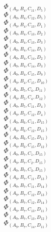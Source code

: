 \documentclass[14pt]{article}
\begin{document}
    $\Phi_{({A}_{9}, {B}_{4}, {C}_{11}, {D}_{5})}$ \\ 
    $\Phi_{({A}_{9}, {B}_{4}, {C}_{12}, {D}_{5})}$ \\ 
    $\Phi_{({A}_{9}, {B}_{4}, {C}_{13}, {D}_{1})}$ \\ 
    $\Phi_{({A}_{9}, {B}_{4}, {C}_{13}, {D}_{2})}$ \\ 
    $\Phi_{({A}_{9}, {B}_{4}, {C}_{13}, {D}_{3})}$ \\ 
    $\Phi_{({A}_{9}, {B}_{4}, {C}_{14}, {D}_{1})}$ \\ 
    $\Phi_{({A}_{9}, {B}_{4}, {C}_{14}, {D}_{2})}$ \\ 
    $\Phi_{({A}_{9}, {B}_{4}, {C}_{14}, {D}_{3})}$ \\ 
    $\Phi_{({A}_{9}, {B}_{4}, {C}_{15}, {D}_{9})}$ \\ 
    $\Phi_{({A}_{9}, {B}_{4}, {C}_{15}, {D}_{10})}$ \\ 
    $\Phi_{({A}_{9}, {B}_{5}, {C}_{4}, {D}_{11})}$ \\ 
    $\Phi_{({A}_{9}, {B}_{5}, {C}_{4}, {D}_{12})}$ \\ 
    $\Phi_{({A}_{9}, {B}_{5}, {C}_{11}, {D}_{4})}$ \\ 
    $\Phi_{({A}_{9}, {B}_{5}, {C}_{12}, {D}_{4})}$ \\ 
    $\Phi_{({A}_{9}, {B}_{6}, {C}_{11}, {D}_{15})}$ \\ 
    $\Phi_{({A}_{9}, {B}_{6}, {C}_{12}, {D}_{15})}$ \\ 
    $\Phi_{({A}_{9}, {B}_{6}, {C}_{15}, {D}_{11})}$ \\ 
    $\Phi_{({A}_{9}, {B}_{6}, {C}_{15}, {D}_{12})}$ \\ 
    $\Phi_{({A}_{9}, {B}_{7}, {C}_{1}, {D}_{15})}$ \\ 
    $\Phi_{({A}_{9}, {B}_{7}, {C}_{2}, {D}_{15})}$ \\ 
    $\Phi_{({A}_{9}, {B}_{7}, {C}_{3}, {D}_{15})}$ \\ 
    $\Phi_{({A}_{9}, {B}_{7}, {C}_{11}, {D}_{13})}$ \\ 
    $\Phi_{({A}_{9}, {B}_{7}, {C}_{11}, {D}_{14})}$ \\ 
    $\Phi_{({A}_{9}, {B}_{7}, {C}_{12}, {D}_{13})}$ \\ 
    $\Phi_{({A}_{9}, {B}_{7}, {C}_{12}, {D}_{14})}$ \\ 
    $\Phi_{({A}_{9}, {B}_{7}, {C}_{13}, {D}_{11})}$ \\ 
    $\Phi_{({A}_{9}, {B}_{7}, {C}_{13}, {D}_{12})}$ \\ 
    $\Phi_{({A}_{9}, {B}_{7}, {C}_{14}, {D}_{11})}$ \\ 
\end{document}
